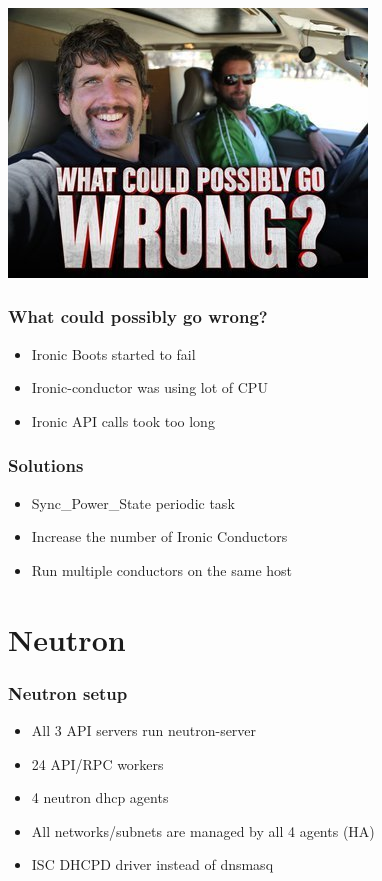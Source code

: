 \documentclass[aspectratio=169,11pt,hyperref={colorlinks=true}]{beamer}
\begin{document}
\begin{frame}
\frametitle{}
    \begin{center}
        \includegraphics[scale=0.75]{logos/wrong2.jpg}
    \end{center}
\end{frame}



\begin{frame}
    \frametitle{What could possibly go wrong?}
    \begin{itemize}[<+-| alert@+>]
        \item Ironic Boots started to fail
        \item Ironic-conductor was using lot of CPU
        \item Ironic API calls took too long
    \end{itemize}
\end{frame}

\begin{frame}
    \frametitle{Solutions}
    \begin{itemize}[<+-| alert@+>]
        \item Sync\_Power\_State periodic task
        \item Increase the number of Ironic Conductors
        \item Run multiple conductors on the same host
    \end{itemize}
\end{frame}


\section{Neutron}
\begin{frame}
    \frametitle{Neutron setup}
    \begin{itemize}[<+-| alert@+>]
        \item All 3 API servers run neutron-server
        \item 24 API/RPC workers
        \item 4 neutron dhcp agents
        \item All networks/subnets are managed by all 4 agents (HA)
        \item ISC DHCPD driver instead of dnsmasq
    \end{itemize}
\end{frame}
\end{document}
